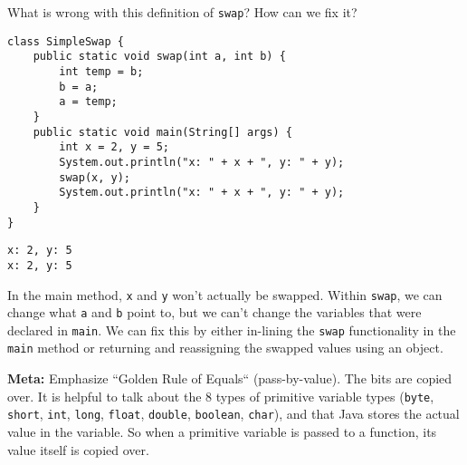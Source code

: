 \question What is wrong with this definition of \texttt{swap}? How can we fix it?

\begin{lstlisting}
class SimpleSwap {
    public static void swap(int a, int b) {
        int temp = b;
        b = a;
        a = temp;
    }
    public static void main(String[] args) {
        int x = 2, y = 5;
        System.out.println("x: " + x + ", y: " + y);
        swap(x, y);
        System.out.println("x: " + x + ", y: " + y);
    }
}
\end{lstlisting}

\begin{solution}
\begin{verbatim}
x: 2, y: 5
x: 2, y: 5
\end{verbatim}
In the main method, \texttt{x} and \texttt{y} won't actually be swapped.
Within \texttt{swap}, we can change what \texttt{a} and \texttt{b} point to, but we can't change the variables that were declared in \texttt{main}. We can fix this by either in-lining the \texttt{swap} functionality in the \texttt{main} method or returning and reassigning the swapped values using an object.

\textbf{Meta:} Emphasize ``Golden Rule of Equals`` (pass-by-value). The bits are copied over.
It is helpful to talk about the 8 types of primitive variable types (\lstinline$byte$, \lstinline$short$, \lstinline$int$, \lstinline$long$, \lstinline$float$, \lstinline$double$, \lstinline$boolean$, \lstinline$char$), and that Java stores the actual value in the variable. So when a primitive variable is passed to a function, its value itself is copied over. 
\end{solution}
